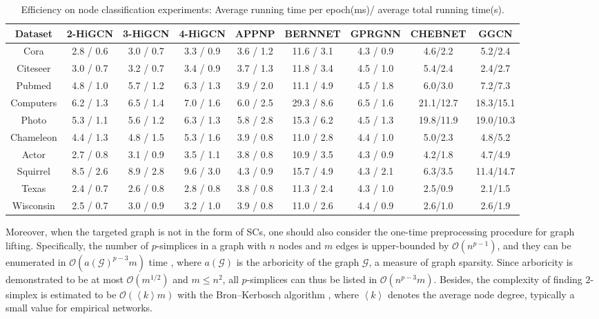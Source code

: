 \documentclass[letterpaper]{article} \usepackage{aaai24}
\theoremstyle{plain}
\theoremstyle{definition}
\theoremstyle{remark}
\begin{document}
\begin{table*}[!ht]
\centering
\begin{tabular}{ccccccccc}
\toprule
Dataset    & 2-HiGCN     & 3-HiGCN   & 4-HiGCN    & APPNP        & BERNNET     & GPRGNN       &CHEBNET     &GGCN \\
\midrule
Cora        & 2.8 / 0.6  & 3.0 / 0.7     & 3.3 / 0.9    &3.6 / 1.2   & 11.6 / 3.1  &4.3 / 0.9        &4.6/2.2  &5.2/2.4\\
Citeseer    & 3.0 / 0.7  & 3.2 / 0.7     & 3.4 / 0.9    &3.7 / 1.3   & 11.8 / 3.4  &4.5 / 1.0        &5.4/2.4  &2.4/2.7\\
Pubmed      & 4.8 / 1.0  & 5.7 / 1.2     & 6.3 / 1.3    &3.9 / 2.0   & 11.1 / 4.9  &4.5 / 1.8        &6.0/3.0  &7.2/7.3\\
Computers   & 6.2 / 1.3  & 6.5 / 1.4     & 7.0 / 1.6    &6.0 / 2.5   & 29.3 / 8.6  &6.5 / 1.6    &21.1/12.7  &18.3/15.1\\
Photo       & 5.3 / 1.1  & 5.6 / 1.2     & 6.3 / 1.3    &5.8 / 2.8   & 15.3 / 6.2  &4.5 / 1.3    &19.8/11.9  &19.0/10.3\\
\midrule
Chameleon   & 4.4 / 1.3  & 4.8 / 1.5     & 5.3 / 1.6    &3.9 / 0.8   & 11.0 / 2.8  &4.4 / 1.0   &5.0/2.3  &4.8/5.2\\
Actor       & 2.7 / 0.8  & 3.1 / 0.9     & 3.5 / 1.1    &3.8 / 0.8   & 10.9 / 3.5  &4.3 / 0.9   &4.2/1.8  &4.7/4.9\\
Squirrel    & 8.5 / 2.6  & 8.9 / 2.8     & 9.6 / 3.0    &4.3 / 0.9   & 15.7 / 4.9  &4.3 / 2.1   &6.3/3.5  &11.4/14.7\\
Texas       & 2.4 / 0.7  & 2.6 / 0.8     & 2.8 / 0.8    &3.8 / 0.8   & 11.3 / 2.4  &4.3 / 1.0   &2.5/0.9  &2.1/1.5\\
Wisconsin   & 2.5 / 0.7  & 3.0 / 0.9     & 3.2 / 1.0    &3.9 / 0.8   & 11.0 / 2.6  &4.4 / 0.9   &2.6/1.0  &2.6/1.9\\
\bottomrule
\end{tabular}\caption{Efficiency on node classification experiments: Average running time per epoch(ms)/ average total running time(s).}
\label{tab: runTime}
\end{table*}


Moreover, when the targeted graph is not in the form of SCs, one should also consider the one-time preprocessing procedure for graph lifting.
Specifically, the number of $p$-simplices in a graph with $n$ nodes and $m$ edges is upper-bounded by $\mathcal{O}(n^{p-1})$, and they can be enumerated in $\mathcal{O}( a\left(\mathcal{G}\right)^{p-3} m)$ time \cite{chiba1985arboricity}, where $a\left(\mathcal{G}\right)$ is the arboricity of the graph $\mathcal{G}$, a measure of graph sparsity.
Since arboricity is demonstrated to be at most $\mathcal{O}(m^{1/2})$ and $m \leq n^2$, all $p$-simplices can thus be listed in $\mathcal{O}\left( n^{p-3} m \right)$.
Besides, the complexity of finding $2$-simplex is estimated to be $\mathcal{O}(\left\langle k \right\rangle m )$ with the Bron–Kerbosch algorithm \cite{find_cliques1973}, where $\left \langle k \right \rangle$ denotes the average node degree, typically a small value for empirical networks.
\end{document}
